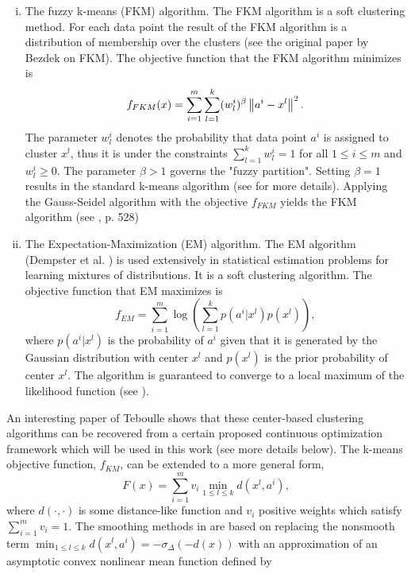 \begin{enumerate}[(i)]
	\item The fuzzy k-means (FKM) algorithm. The FKM algorithm is a soft clustering method. For each data point the result of the FKM algorithm is a distribution of membership over the clusters (see \cite{B1981} the original paper by Bezdek on FKM). The objective function that the FKM algorithm minimizes is
	\begin{equation*}
		f_{FKM}(x) = \sum\limits_{i=1}^{m}\sum\limits_{l=1}^{k}(w^i_l)^\beta \left\Vert {a^i-x^l} \right\Vert^2.
	\end{equation*}
	The parameter $w^i_l$ denotes the probability that data point $a^i$ is assigned to cluster $x^l$, thus it is under the constraints $\sum_{l=1}^{k} w^i_l = 1$ for all $1 \leq i \leq m$ and $w^i_l \geq 0$. The parameter $\beta > 1$ governs the "fuzzy partition". Setting $\beta = 1$ results in the standard k-means algorithm (see  for more details). Applying the Gauss-Seidel algorithm with the objective $f_{FKM}$ yields the FKM algorithm (see \cite{DHS2001}, p. 528)
	\item The Expectation-Maximization (EM) algorithm. The EM algorithm (Dempster et al. \cite{DLR1977}) is used extensively in statistical estimation problems for learning mixtures of distributions. It is a soft clustering algorithm. The objective function that EM maximizes is 
	\begin{equation*}
		f_{EM} = \sum\limits_{i=1}^{m} \log \left( \sum\limits_{l=1}^{k} p\left(a^i|x^l\right) p\left(x^l\right) \right),
	\end{equation*}
	where  $p\left(a^i|x^l\right)$ is the probability of $a^i$ given that it is generated by the Gaussian distribution with center $x^l$ and $p\left(x^l\right)$ is the prior probability of center $x^l$. The algorithm is guaranteed to converge to a local maximum of the likelihood function (see \cite{W1983}).
\end{enumerate}
An interesting paper of Teboulle \cite{T2007} shows that these center-based clustering algorithms can be recovered from a certain proposed continuous optimization framework which will be used in this work (see more details below). The k-means objective function, $f_{KM}$, can be extended to a more general form,
	\begin{equation}
		F(x)=\sum\limits_{i=1}^m v_i \min\limits_{1\leq l \leq k} d\left(x^l,a^i\right), \label{clustering_objective}
	\end{equation}
	where $d(\cdot,\cdot)$ is some distance-like function and $v_i$ positive weights which satisfy $\sum_{i=1}^m v_i=1$. The smoothing methods in \cite{T2007} are based on replacing the nonsmooth term $\min_{1\leq l \leq k} d\left(x^l,a^i\right) = -\sigma_{\Delta}(-d(x))$ with an approximation of an asymptotic convex nonlinear mean function defined by
